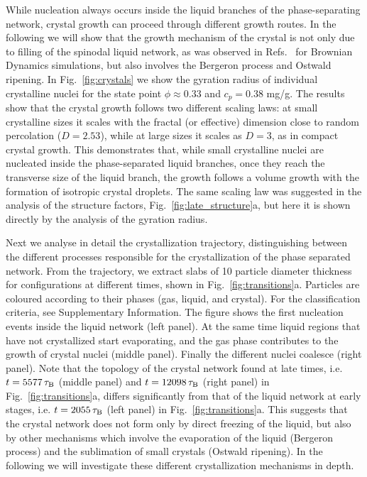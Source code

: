 \documentclass[preprint,amsmath,amssymb,superscriptaddress]{revtex4-1}
\begin{document}
While nucleation always occurs inside the liquid branches of the phase-separating network, crystal growth can proceed through different growth routes.
In the following we will show that the growth mechanism of the crystal is not only due to filling of the spinodal liquid network, as was observed in Refs.~\cite{soga1999metastable,fortini2008crystallization,perez2011pathways} for Brownian Dynamics simulations, but also involves the Bergeron process and Ostwald ripening. 
In Fig.~\ref{fig:crystals} we show the gyration radius of individual crystalline nuclei for the state point 
$\phi\approx 0.33$ and $c_p=0.38$ mg/g. The results show that the crystal growth follows two different scaling laws: at small crystalline sizes it scales with 
the fractal (or effective) dimension close to random percolation ($D=2.53$), while at large sizes it scales as $D=3$, as in compact crystal growth. This demonstrates that, while 
small crystalline nuclei are nucleated inside the phase-separated liquid branches, once they reach the transverse size of the liquid branch, the growth 
follows a volume growth with the formation of isotropic crystal droplets. The same scaling law was suggested in the analysis of the
structure factors, Fig.~\ref{fig:late_structure}a, but here it is shown directly by the analysis of the gyration radius. 

Next we analyse in detail the crystallization trajectory, distinguishing between the different processes responsible for the
crystallization of the phase separated network.
From the trajectory, we extract slabs of 10 particle diameter thickness for configurations at different times, shown in Fig.~\ref{fig:transitions}a. 
Particles are coloured according to their phases (gas, liquid, and crystal). For the classification criteria, see Supplementary Information. The figure shows the first nucleation 
events inside the liquid network (left panel). At the same time liquid regions that have not crystallized start evaporating, and the gas phase contributes to the growth of crystal nuclei (middle panel). Finally the different nuclei coalesce (right panel). 
Note that the topology of the crystal network found at late times, i.e. $t=5577\,\tau_{\rm B}$ (middle panel) and $t=12098\,\tau_{\rm B}$ (right panel) in Fig.~\ref{fig:transitions}a, differs significantly from that of the liquid network at early stages, i.e. $t=2055\,\tau_{\rm B}$ (left panel) in Fig.~\ref{fig:transitions}a. This suggests that the crystal network does not form only by direct freezing of the liquid, but also by other mechanisms which involve the evaporation of the liquid (Bergeron process) and the sublimation of small crystals (Ostwald ripening). In the following we will investigate these different crystallization mechanisms in depth.
 
\end{document}
